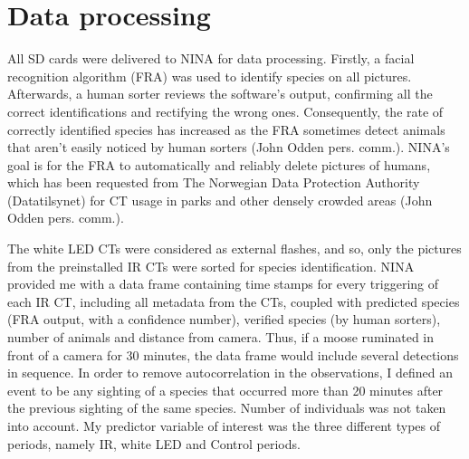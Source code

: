 






\section{Data processing} 

All SD cards were delivered to NINA for data processing.
Firstly, a facial recognition algorithm (FRA) was used to identify species on all pictures. %
Afterwards, a human sorter reviews the software's output, confirming all the correct identifications and rectifying the wrong ones. 
Consequently, the rate of correctly identified species has increased as the FRA sometimes detect animals that aren't easily noticed by human sorters (John Odden pers. comm.). 
NINA's goal is for the FRA to automatically and reliably delete pictures of humans, which has been requested from The Norwegian Data Protection Authority (Datatilsynet) for CT usage in parks and other densely crowded areas (John Odden pers. comm.).

The white LED CTs were considered as external flashes, and so, only the pictures from the preinstalled IR CTs were sorted for species identification.
NINA provided me with a data frame containing time stamps for every triggering of each IR CT, including all metadata from the CTs, coupled with predicted species (FRA output, with a confidence number), verified species (by human sorters), number of animals and distance from camera.
Thus, if a moose ruminated in front of a camera for 30 minutes, the data frame would include several detections in sequence.
In order to remove autocorrelation in the observations, I defined an event to be any sighting of a species that occurred more than 20 minutes after the previous sighting of the same species.
Number of individuals was not taken into account.
My predictor variable of interest was the three different types of periods, namely IR, white LED and Control periods.

